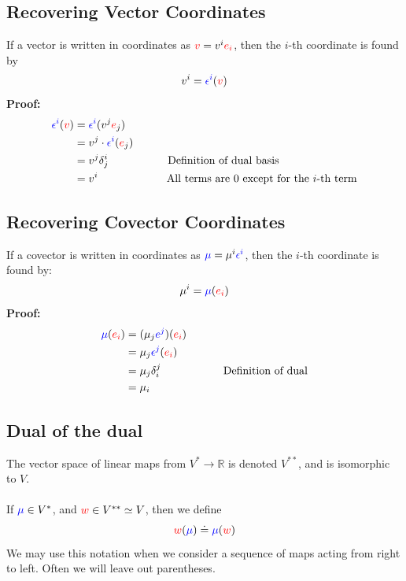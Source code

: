 \documentclass[10pt]{article}
\newcommand{\R}{\mathbb{R}}
\begin{document}
\subsection*{Recovering Vector Coordinates}
If a vector is written in coordinates as $\textcolor{red}{v} = v^i \textcolor{red}{e_i}$, then the $i$-th coordinate is found by
\[v^i = \textcolor{blue}{\epsilon^i}(\textcolor{red}{v})\]
\textbf{Proof:}
\begin{align*}
    \textcolor{blue}{\epsilon^i}(\textcolor{red}{v}) &= \textcolor{blue}{\epsilon^i}(v^j \textcolor{red}{e}_j)\\
    &= v^j \cdot \textcolor{blue}{\epsilon^i}(\textcolor{red}{e}_j)\\
    &= v^j \delta_j^i \hspace{1.9cm} \text{Definition of dual basis}\\
    &= v^i \hspace{2.2cm} \text{All terms are 0 except for the $i$-th term}
\end{align*}

\subsection*{Recovering Covector Coordinates}
If a covector is written in coordinates as $\textcolor{blue}{\mu} = \mu^i \textcolor{blue}{\epsilon^i}$, then the $i$-th coordinate is found by:
\[\mu^i = \textcolor{blue}{\mu}(\textcolor{red}{e_i})\]
\textbf{Proof:}
\begin{align*}
    \textcolor{blue}{\mu}(\textcolor{red}{e_i}) &= (\mu_j \textcolor{blue}{e^j})(\textcolor{red}{e_i})\\
    &= \mu_j \textcolor{blue}{\epsilon^j} (\textcolor{red}{e_i}) \\
    &= \mu_j \delta_i^j \hspace{2cm} \text{Definition of dual}\\
    &= \mu_i
\end{align*}

\subsection*{Dual of the dual}
The vector space of linear maps from $V^* \rightarrow \R$ is denoted $V^{**}$, and is isomorphic to $V$.\\\\
If $\textcolor{blue}{\mu} \in V^*$, and $\textcolor{red}{w} \in V^{**} \simeq V$, then we define
\[\textcolor{red}{w}(\textcolor{blue}{\mu}) \doteq \textcolor{blue}{\mu}(\textcolor{red}{w})\]
We may use this notation when we consider a sequence of maps acting from right to left.  Often we will leave out parentheses.
\end{document}
